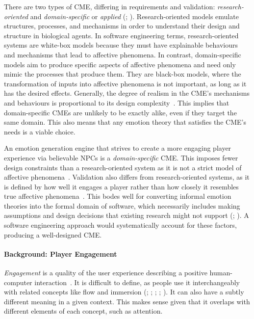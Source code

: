 There are two types of CME, differing in requirements and validation:
\textit{research-oriented} and \textit{domain-specific} or \textit{applied}
(;
). Research-oriented models emulate
structures, processes, and mechanisms in order to understand their design and
structure in biological agents. In software engineering terms,
research-oriented systems are white-box models because they must have
explainable behaviours and mechanisms that lead to affective phenomena. In
contrast, domain-specific models aim to produce specific aspects of affective
phenomena and need only mimic the processes that produce them. They are
black-box models, where the transformation of inputs into affective phenomena
is not important, as long as it has the desired effects. Generally, the degree
of realism in the CME's mechanisms and behaviours is proportional to its design
complexity~\citep[p.~83]{rosis2003from}. This implies that domain-specific CMEs
are unlikely to be exactly alike, even if they target the same domain. This
also means that any emotion theory that satisfies the CME's needs is a viable
choice.

An emotion generation engine that strives to create a more engaging player
experience via believable NPCs is a \textit{domain-specific} CME. This imposes
fewer design constraints than a research-oriented system as it is not a strict
model of affective phenomena~\citep[p.~233]{sloman2005architectural}.
Validation also differs from research-oriented systems, as it is defined by how
well it engages a player rather than how closely it resembles true affective
phenomena~\citep[p.~131]{hudlicka2019modeling}. This bodes well for converting
informal emotion theories into the formal domain of software, which necessarily
includes making assumptions and design decisions that existing research might
not support (;
). A software engineering approach would
systematically account for these factors, producing a well-designed CME.

\paragraph{Background: Player Engagement} \textit{Engagement} is a quality of
the user experience describing a positive human-computer
interaction~\citep[p.~1094]{o2013examining}. It is difficult to define, as
people use it interchangeably with related concepts like flow and immersion
(; ;
; ;
). It can also have a subtly different
meaning in a given context. This makes sense given that it overlaps with
different elements of each concept, such as attention.

